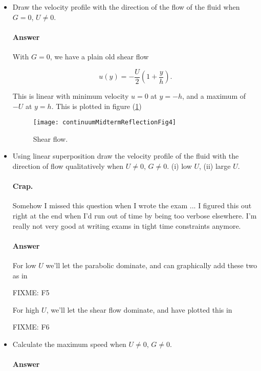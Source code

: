 \begin{itemize}
\item Draw the velocity profile with the direction of the flow of the fluid when $G = 0$, $U \ne 0$.

\paragraph{Answer}

With $G = 0$, we have a plain old shear flow

\begin{equation}\label{eqn:continuumMidTermReflection:670}
u(y) = - \frac{U}{2} \left( 1 + \frac{y}{h} \right).
\end{equation}

This is linear with minimum velocity $u = 0$ at $y = -h$, and a maximum of $-U$ at $y = h$.  This is plotted in figure (\ref{fig:continuumMidtermReflection:continuumMidtermReflectionFig4})
\begin{figure}[htp]
   \centering
   \texttt{[image: continuumMidtermReflectionFig4]}
   \caption{Shear flow.}\label{fig:continuumMidtermReflection:continuumMidtermReflectionFig4}
\end{figure}

\item Using linear superposition draw the velocity profile of the fluid with the direction of flow qualitatively when $U \ne 0$, $G \ne 0$. (i) low $U$, (ii) large $U$.
\paragraph{Crap.} Somehow I missed this question when I wrote the exam ... I figured this out right at the end when I'd run out of time by being too verbose elsewhere.  I'm really not very good at writing exams in tight time constraints anymore.

\paragraph{Answer}

For low $U$ we'll let the parabolic dominate, and can graphically add these two as in

FIXME: F5

For high $U$, we'll let the shear flow dominate, and have plotted this in

FIXME: F6

\item Calculate the maximum speed when $U \ne 0$, $G \ne 0$.
\paragraph{Answer}


\end{itemize}
